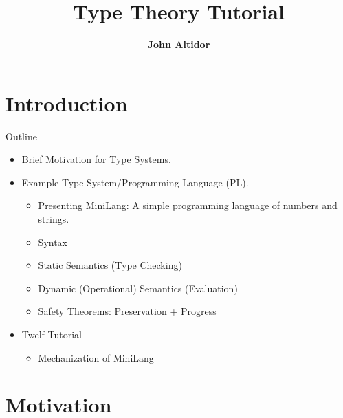 \documentclass{beamer}
\title[Type Theory Tutorial\hspace{2em}\insertframenumber/
\inserttotalframenumber]{Type Theory Tutorial}
\author[John Altidor]{\textbf{John Altidor}}
\date{}
\institute{Logic Seminar Lecture}
\begin{document}
\frame{\titlepage}

\section{Introduction}

\begin{frame}{Outline}
\begin{itemize}
\item Brief Motivation for Type Systems.

\item Example Type System/Programming Language (PL).
  \begin{itemize}
	\item Presenting MiniLang:
	A simple programming language of numbers and strings.
	\item Syntax
	\item Static Semantics (Type Checking)
	\item Dynamic (Operational) Semantics (Evaluation)
	\item Safety Theorems: Preservation + Progress
  \end{itemize}
\item Twelf Tutorial
	\begin{itemize}
	\item Mechanization of MiniLang
	\end{itemize}
\end{itemize}
\end{frame}

\section{Motivation}
\end{document}
